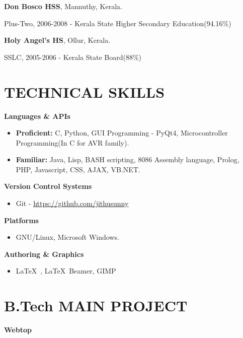 \begin{resume}
{\bf \textsf{Don Bosco HSS}}, Mannuthy, Kerala.\\
\vspace*{-.1in}
\begin{list1}
\item[] Plus-Two, 2006-2008 - Kerala State Higher Secondary Education\qquad \qquad(94.16\%)
\end{list1}

{\bf \textsf{Holy Angel's HS}}, Ollur, Kerala.\\
\vspace*{-.1in}
\begin{list1}
\item[] SSLC, 2005-2006 - Kerala State Board\qquad \qquad \qquad(88\%)
\end{list1}

\vspace*{+3.5mm}
 \section{\sc \bf \textsf{TECHNICAL SKILLS}}
\textbf{Languages \& APIs}
\begin{itemize}
\item \textbf{Proficient:} C, Python, GUI Programming - PyQt4, Microcontroller Programming(In C for AVR family).
\item \textbf{Familiar:} Java, Lisp, BASH scripting, 8086 Assembly language, Prolog, PHP, Javascript, CSS, AJAX, VB.NET.
\end{itemize}

\textbf{Version Control Systems}
\begin{itemize}
\item Git - \href{https://github.com/jithusunny}{\underline{https://github.com/jithusunny}}
\end{itemize}

\textbf{Platforms}
\begin{itemize}
\item GNU/Linux, Microsoft Windows.
\end{itemize}

\textbf{Authoring \& Graphics}
\begin{itemize}
\item \LaTeX\ , \LaTeX\ Beamer, GIMP
\end{itemize}

\vspace*{+2mm} 

\section{\sc \bf \textsf{B.Tech MAIN PROJECT}}
{\bf \textsf{Webtop}}\\
\vspace*{-.1in}


\end{resume}
